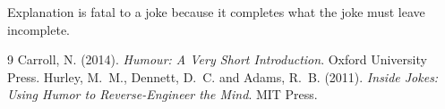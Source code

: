 \documentclass{situationist-preprint}
\begin{document}
Explanation is fatal to a joke because it completes what the joke must leave incomplete.

\begin{thebibliography}{9}\small
{} Carroll, N. (2014). \emph{Humour: A Very Short Introduction}. Oxford University Press.
 Hurley, M.~M., Dennett, D.~C. and Adams, R.~B. (2011). \emph{Inside Jokes: Using Humor to Reverse-Engineer the Mind}. MIT Press.
\end{thebibliography}
\end{document}
